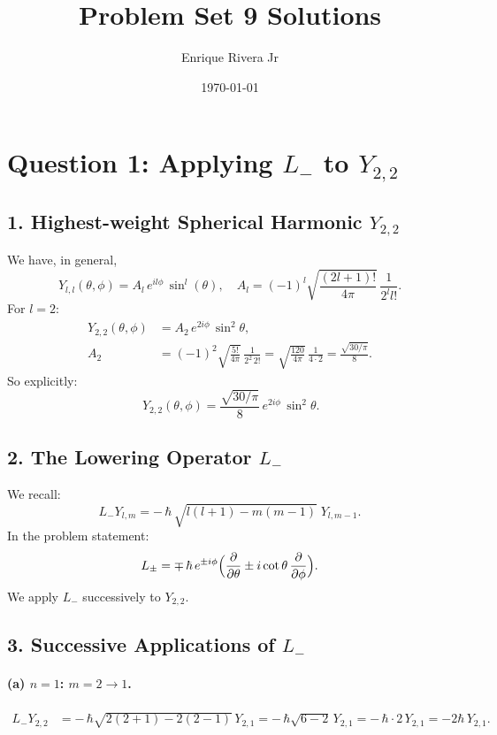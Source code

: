 \documentclass[12pt]{article}
\begin{document}
\title{Problem Set 9 Solutions}
\author{Enrique Rivera Jr}
\date{\today}

\maketitle


\section*{Question 1: Applying $L_{-}$ to $Y_{2,2}$}

\subsection*{1. Highest-weight Spherical Harmonic $Y_{2,2}$}
We have, in general,
\begin{equation}
Y_{l,l}(\theta,\phi) = A_l\, e^{i l \phi}\, \sin^l(\theta), \quad
A_l = (-1)^l \sqrt{\frac{(2l+1)!}{4\pi}}\,\frac{1}{2^l l!}.
\end{equation}
For $l=2$:
\begin{align*}
Y_{2,2}(\theta,\phi) &= A_2\, e^{2i\phi}\, \sin^2\theta, \\
A_2 &= (-1)^2 \sqrt{\frac{5!}{4\pi}}\,\frac{1}{2^2\,2!}
= \sqrt{\frac{120}{4\pi}}\,\frac{1}{4\cdot 2}
= \frac{\sqrt{30/\pi}}{8}.
\end{align*}
So explicitly:
\[
\boxed{\,Y_{2,2}(\theta,\phi) = \frac{\sqrt{30/\pi}}{8}\, e^{2i\phi}\, \sin^2\theta.}\]

\subsection*{2. The Lowering Operator $L_{-}$}
We recall:
\begin{equation}
L_{-} Y_{l,m} = -\,\hbar\,\sqrt{l(l+1) - m(m-1)}\; Y_{l,m-1}.
\end{equation}
In the problem statement:
\begin{equation}
L_{\pm} = \mp\,\hbar\, e^{\pm i\phi}\Bigl( \frac{\partial}{\partial \theta} \pm i\cot\theta\,\frac{\partial}{\partial \phi}\Bigr).
\end{equation}
We apply $L_{-}$ successively to $Y_{2,2}$.

\subsection*{3. Successive Applications of $L_{-}$}
\paragraph{(a) $n=1$: $m=2\to1$.}
\begin{align*}
L_{-} Y_{2,2} &= -\,\hbar \sqrt{2(2+1) - 2(2-1)}\,Y_{2,1}
= -\,\hbar \sqrt{6 - 2}\,Y_{2,1}
= -\,\hbar\cdot 2\,Y_{2,1}
= -2\hbar\,Y_{2,1}.
\end{align*}
\end{document}
